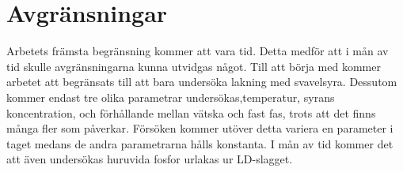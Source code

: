 \section{Avgränsningar}



Arbetets främsta begränsning kommer att vara tid. Detta medför att i mån av tid skulle avgränsningarna kunna utvidgas något. Till att börja med kommer arbetet att  begränsats till att bara undersöka lakning med svavelsyra. Dessutom kommer endast tre olika parametrar undersökas,temperatur, syrans koncentration, och förhållande mellan vätska och fast fas, trots att det finns många fler som påverkar. Försöken kommer utöver detta variera en parameter i taget medans de andra parametrarna hålls konstanta. I mån av tid kommer det att även undersökas huruvida fosfor urlakas ur LD-slagget.  

